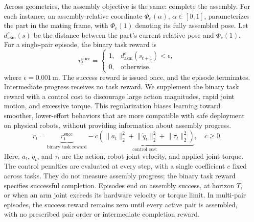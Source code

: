 Across geometries, the assembly objective is the same: complete the assembly.
For each instance, an assembly-relative coordinate $\Phi_e(\alpha)$,
$\alpha\in[0,1]$, parameterizes the part in the mating frame, with
$\Phi_e(1)$ denoting its fully assembled pose. Let $d_{\mathrm{asm}}^e(s)$ be
the distance between the part's current relative pose and $\Phi_e(1)$.
For a single-pair episode, the binary task reward is
\begin{equation}
    r_t^{\mathrm{succ}}
    =
    \begin{cases}
        1, & d_{\mathrm{asm}}^e(s_{t+1})<\epsilon,\\
        0, & \text{otherwise}.
    \end{cases}
    \label{eq:sparse-reward}
\end{equation}
where $\epsilon=0.001\,\mathrm{m}$.
The success reward is issued once, and the episode terminates.
Intermediate progress receives no task reward.
We supplement the binary task reward with a control cost to discourage
large action magnitudes, rapid joint motion, and excessive torque.
This regularization biases learning toward smoother, lower-effort behaviors that are more compatible with safe deployment on physical robots, without providing information about assembly progress.
\begin{equation}
    r_t = \underbrace{r_t^{\mathrm{succ}}}_{\text{binary task reward}} - \underbrace{c\left(\lVert a_t\rVert_2^2 + \lVert \dot{q}_t\rVert_2^2 + \lVert \tau_t\rVert_2^2\right)}_{\text{control cost}}, \quad c \geq 0.
    \label{eq:full-reward}
\end{equation}
Here, $a_t$, $\dot{q}_t$, and $\tau_t$ are the action, robot joint velocity, and
applied joint torque. The control penalties are evaluated at every step,
with a single coefficient $c$ fixed across tasks. They do not measure
assembly progress; the binary task reward specifies successful completion.
Episodes end on assembly success, at horizon $T$, or when an arm joint
exceeds its hardware velocity or torque limit. 
In multi-pair episodes, the success reward remains zero until every active pair is
assembled, with no prescribed pair order or intermediate completion
reward.

